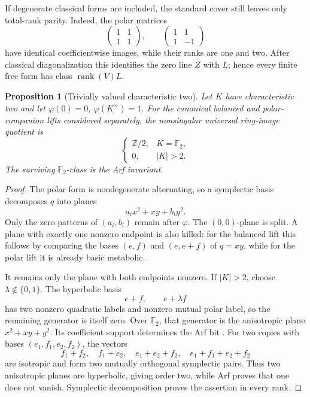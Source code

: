 \documentclass[11pt]{article}
\newtheorem{proposition}[theorem]{Proposition}
\theoremstyle{definition}
\theoremstyle{remark}
\newcommand{\Integers}{\mathbb Z}
\newcommand{\rank}{\operatorname{rank}}
\begin{document}
If degenerate classical forms are included, the standard cover still leaves
only total-rank parity.  Indeed, the polar matrices
\[
 \begin{pmatrix}1&1\\1&1\end{pmatrix},
 \qquad
 \begin{pmatrix}1&1\\1&-1\end{pmatrix}
\]
have identical coefficientwise images, while their ranks are one and two.
After classical diagonalization this identifies the zero line \(Z\) with
\(L\); hence every finite free form has class \(\rank(V)L\).

\begin{proposition}[Trivially valued characteristic two]\label{prop:char2collapse}
Let \(K\) have characteristic two and let \(\varphi(0)=0\),
\(\varphi(K^\times)=1\).  For the canonical balanced and polar-companion lifts
considered separately, the nonsingular universal ring-image quotient is
\[
 \begin{cases}
  \Integers/2,&K=\mathbb F_2,\\
  0,&|K|>2.
 \end{cases}
\]
The surviving \(\mathbb F_2\)-class is the Arf invariant.
\end{proposition}

\begin{proof}
The polar form is nondegenerate alternating, so a symplectic basis decomposes
\(q\) into planes
\[
 a_ix^2+xy+b_iy^2.
\]
Only the zero patterns of \((a_i,b_i)\) remain after \(\varphi\).  The
\((0,0)\)-plane is split.  A plane with exactly one nonzero endpoint is also
killed: for the balanced lift this follows by comparing the bases
\((e,f)\) and \((e,e+f)\) of \(q=xy\), while for the polar lift it is already
basic metabolic.

It remains only the plane with both endpoints nonzero.  If \(|K|>2\), choose
\(\lambda\notin\{0,1\}\).  The hyperbolic basis
\[
 e+f,\qquad e+\lambda f
\]
has two nonzero quadratic labels and nonzero mutual polar label, so the
remaining generator is itself zero.  Over \(\mathbb F_2\), that generator is
the anisotropic plane \(x^2+xy+y^2\).  Its coefficient support determines the
Arf bit \cite{arf1941}.  For two copies with bases
\((e_1,f_1,e_2,f_2)\), the vectors
\[
 f_1+f_2,\quad f_1+e_2,\quad
 e_1+e_2+f_2,\quad e_1+f_1+e_2+f_2
\]
are isotropic and form two mutually orthogonal symplectic pairs.  Thus two
anisotropic planes are hyperbolic, giving order two, while Arf proves that one
does not vanish.  Symplectic decomposition proves the assertion in every
rank.
\end{proof}
\end{document}

